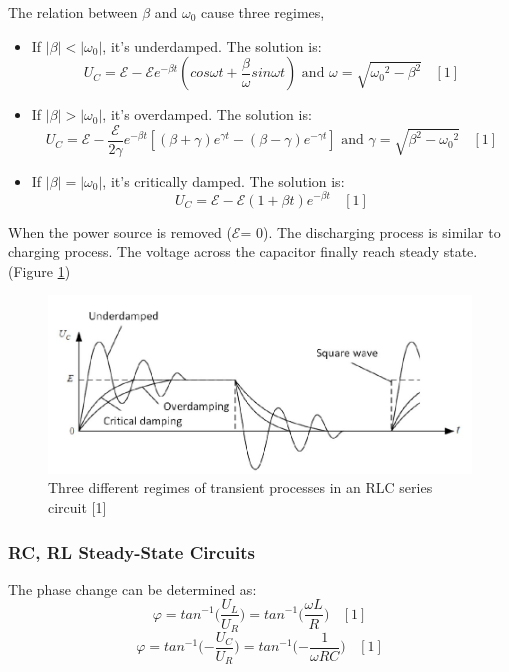 \documentclass[12pt,a4paper]{article}
\begin{document}
The relation between $\beta$ and $\omega_0$ cause three regimes,
\begin{itemize}
    \item 	If $|\beta|<|{\omega_0}|$, it's underdamped. The solution is:
    $$U_C=\mathcal{E}-\mathcal{E} e^{-\beta t}(cos{\omega}t+\frac{\beta}{\omega}sin{\omega}t)\text{ and } \omega=\sqrt{{\omega_0}^2-\beta^2}~~~~[1]$$
    \item If $|\beta|>|{\omega_0}|
    $, it's overdamped. The solution is:
    $$U_C=\mathcal{E}-\frac{\mathcal{E}}{2\gamma}e^{-\beta t}\left[\left(\beta+\gamma\right)e^{\gamma t}-\left(\beta-\gamma\right)e^{-\gamma t}\right]\text{ and }\gamma=\sqrt{\beta^2-{\omega_0}^2}~~~~[1]$$
    \item If $|\beta|=|{\omega_0}|$, it's critically damped. The solution is:
    $$U_C=\mathcal{E}-\mathcal{E}(1+\beta t)e^{-\beta t}~~~~[1]$$
\end{itemize}

When the power source is removed ($\mathcal{E}$= 0). The discharging process is similar to charging process.
The voltage across the capacitor finally reach steady state. (Figure \ref{rlc})

\begin{figure}[H]
    \centering
    \includegraphics[width=12cm]{rlc.png} 
    \caption{Three different regimes of transient processes in an RLC series circuit    [1]}
    \label{rlc}
\end{figure}

\subsubsection{RC, RL Steady-State Circuits}
The phase change can be determined as: 
$$\varphi={tan}^{-1}{(}\frac{U_L}{U_R})={tan}^{-1}{(}\frac{\omega L}{R})~~~~[1]$$
$$\varphi={tan}^{-1}{(}-\frac{U_C}{U_R})={tan}^{-1}{(}-\frac{1}{\omega RC})~~~~[1]$$
\end{document}
